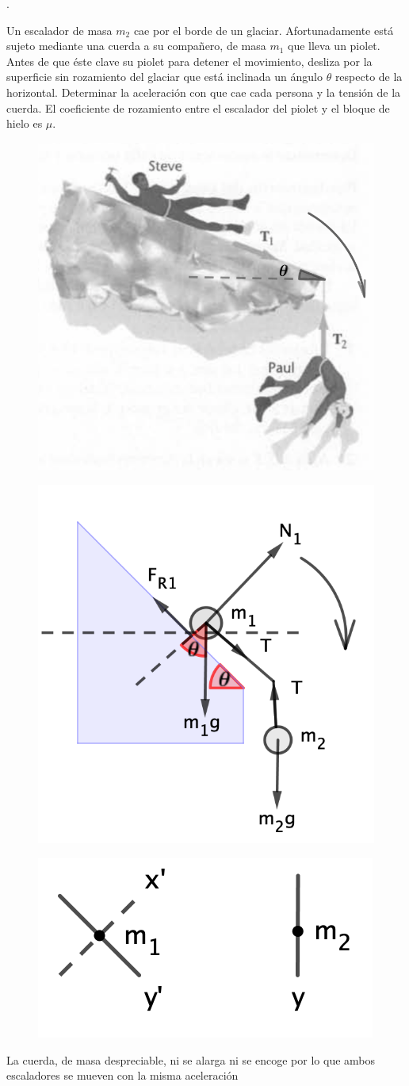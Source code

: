 \newpage %
\begin{prob}.
\begin{multicols}{2}
Un escalador de masa $m_2$ cae por el borde de un glaciar. Afortunadamente está sujeto mediante una cuerda a su compañero, de masa $m_1$ que lleva un piolet. Antes de que éste clave su piolet para detener el movimiento, desliza por la superficie sin rozamiento del glaciar que está inclinada un ángulo $\theta$ respecto de la horizontal. Determinar la aceleración con que cae cada persona y la tensión de la cuerda. El coeficiente de rozamiento entre el escalador del piolet y el bloque de hielo es $\mu$.
	\begin{figure}[H]
	\centering
	\includegraphics[width=.55\textwidth]{imagenes/imagenes03/T03IM61.png}
	\end{figure}
\end{multicols}
\end{prob}

\begin{multicols}{2}
\begin{figure}[H]
	\centering
	\includegraphics[width=.4\textwidth]{imagenes/imagenes03/T03IM62.png}
	\end{figure}
	
\begin{figure}[H]
	\centering
	\includegraphics[width=.4\textwidth]{imagenes/imagenes03/T03IM63.png}
	\end{figure}
La cuerda, de masa despreciable, ni se alarga ni se encoge por lo que ambos escaladores se mueven con la misma aceleración
\end{multicols}	

